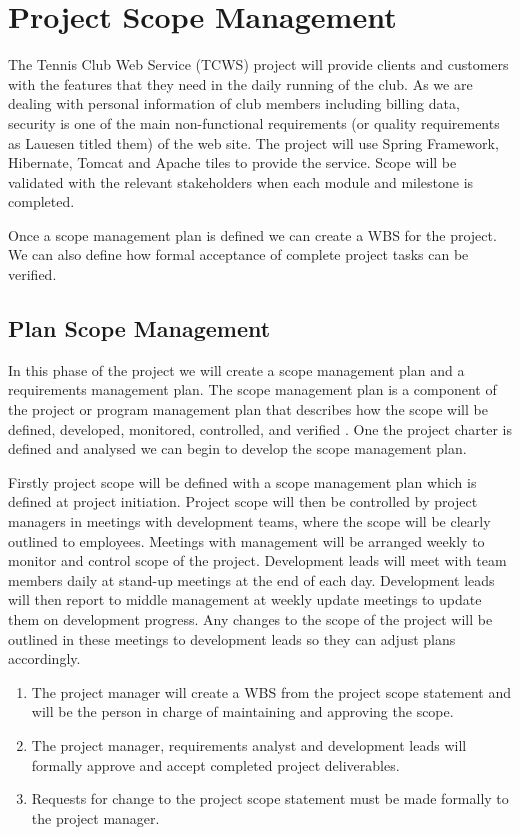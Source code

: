 \chapter{Project Scope Management}

The Tennis Club Web Service (TCWS) project will provide clients and customers with the features that they need in the daily running of the club. As we are dealing with personal information of club members including billing data, security is one of the main non-functional requirements (or quality requirements as Lauesen titled them) of the web site. The project will use Spring Framework, Hibernate, Tomcat and Apache tiles to provide the service.
Scope will be validated with the relevant stakeholders when each module and milestone is completed.

Once a scope management plan is defined we can create a WBS for the project. We can also define how formal acceptance of complete project tasks can be verified.

\section{Plan Scope Management}

In this phase of the project we will create a scope management plan and a requirements management plan. The scope management plan is a component of the project or program management plan that describes how the scope will be defined, developed, monitored, controlled, and verified \parencite{pmbok}. One the project charter is defined and analysed we can begin to develop the scope management plan.

Firstly project scope will be defined with a scope management plan which is defined at project initiation. Project scope will then be controlled by project managers in meetings with development teams, where the scope will be clearly outlined to employees. Meetings with management will be arranged weekly to monitor and control scope of the project. Development leads will meet with team members daily at stand-up meetings at the end of each day. Development leads will then report to middle management at weekly update meetings to update them on development progress. Any changes to the scope of the project will be outlined in these meetings to development leads so they can adjust plans accordingly.

\begin{enumerate}
\item The project manager will create a WBS from the project scope statement and will be the person in charge of maintaining and approving the scope.
\item The project manager, requirements analyst and development leads will formally approve and accept completed project deliverables. 
\item Requests for change to the project scope statement must be made formally to the project manager.
\end{enumerate}

